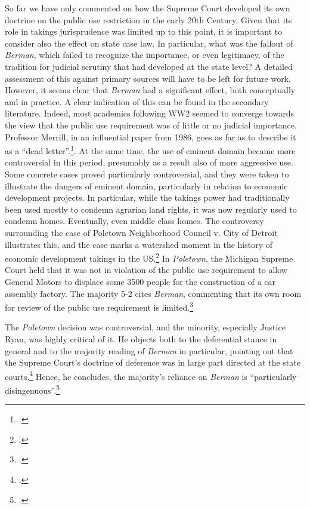 So far we have only commented on how the Supreme Court developed its own doctrine on the public use restriction in the early 20th Century. Given that its role in takings jurisprudence was limited up to this point, it is important to consider also the effect on state case law. In particular, what was the fallout of {\it Berman}, which failed to recognize the importance, or even legitimacy, of the tradition for judicial scrutiny that had developed at the state level? A detailed assessment of this against primary sources will have to be left for future work. However, it seems clear that {\it Berman} had a significant effect, both conceptually and in practice. A clear indication of this can be found in the secondary literature. Indeed, most academics following WW2 seemed to converge towards the view that the public use requirement was of little or no judicial importance. Professor Merrill, in an influential paper from 1986, goes as far as to describe it as a ``dead letter''.\footcite[]{merrill86}. At the same time, the use of eminent domain became more controversial in this period, presumably as a result also of more aggressive use. Some concrete cases proved particularly controversial, and they were taken to illustrate the dangers of eminent domain, particularly in relation to economic development projects. In particular, while the takings power had traditionally been used mostly to condemn agrarian land rights, it was now regularly used to condemn homes. Eventually, even middle class homes. The controversy surrounding the case of Poletown Neighborhood Council v. City of Detroit  illustrates this, and the case marks a watershed moment in the history of  economic development takings in the US.\footcite[See][380-381]{underkuffler09} In {\it Poletown}, the Michigan Supreme Court held that it was not in violation of the public use requirement to allow General Motors to displace some 3500 people for the construction of a car assembly factory. The majority 5-2 cites {\it Berman}, commenting that its own room for review of the public use requirement is limited.\footcite[632-633]{poletown81}

The {\it Poletown} decision was controversial, and the minority, especially Justice Ryan, was highly critical of it. He objects both to the deferential stance in general and to the majority reading of {\it Berman} in particular, pointing out that the Supreme Court's doctrine of deference was in large part directed at the state courts.\footcite[668]{poletown81} Hence, he concludes, the majority's reliance on {\it Berman} is ``particularly disingenuous''.\footcite[668]{poletown81} 

